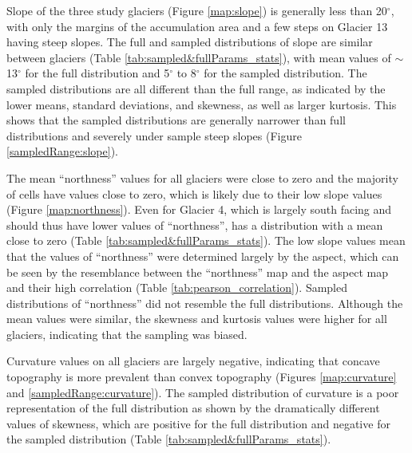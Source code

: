 \documentclass{sfuthesis}
\begin{document}
Slope of the three study glaciers (Figure \ref{map:slope}) is generally less than 20$^{\circ}$, with only the margins of the accumulation area and a few steps on Glacier 13 having steep slopes. The full and sampled distributions of slope are similar between glaciers (Table \ref{tab:sampled&fullParams_stats}), with mean values of $\sim$13$^{\circ}$ for the full distribution and 5$^{\circ}$ to 8$^{\circ}$ for the sampled distribution. The sampled distributions are all different than the full range, as indicated by the lower means, standard deviations, and skewness, as well as larger kurtosis. This shows that the sampled distributions are generally narrower than full distributions and severely under sample steep slopes (Figure \ref{sampledRange:slope}).

The mean ``northness'' values for all glaciers were close to zero and the majority of cells have values close to zero, which is likely due to their low slope values (Figure \ref{map:northness}). Even for Glacier 4, which is largely south facing and should thus have lower values of ``northness'', has a distribution with a mean close to zero (Table \ref{tab:sampled&fullParams_stats}). The low slope values mean that the values of ``northness'' were determined largely by the aspect, which can be seen by the resemblance between the ``northness'' map and the aspect map and their high correlation (Table \ref{tab:pearson_correlation}). Sampled distributions of ``northness'' did not resemble the full distributions. Although the mean values were similar, the skewness and kurtosis values were higher for all glaciers, indicating that the sampling was biased.

Curvature values on all glaciers are largely negative, indicating that concave topography is more prevalent than convex topography (Figures \ref{map:curvature} and \ref{sampledRange:curvature}). The sampled distribution of curvature is a poor representation of the full distribution as shown by the dramatically different values of skewness, which are positive for the full distribution and negative for the sampled distribution (Table \ref{tab:sampled&fullParams_stats}). 
\end{document}
